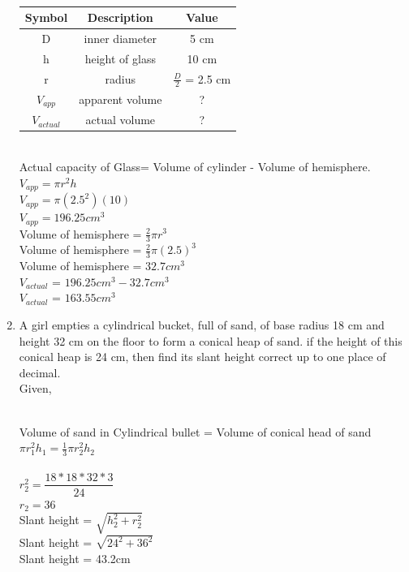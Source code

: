 \documentclass[journal,12pt,twocolumn]{IEEEtran}
\renewcommand\thesection{\arabic{section}}
\begin{document}
\begin{enumerate}[label=\thesection.\arabic*.,ref=\thesection.\theenumi]
\begin{table}[ht]
{\begin{tabular}{ |c|c|c| }
 \hline
 Symbol & Description & Value\\
 \hline
 D & inner diameter & 5 cm \\
 \hline
 h & height of glass & 10 cm \\
 \hline
 r & radius & $\frac{D}{2}$ = 2.5 cm \\
 \hline
 $V_{app}$ & apparent volume & ? \\
 \hline
 $V_{actual}$ & actual volume & ? \\
 \hline
\end{tabular}}
 \caption{}
 \end{table} \\
Actual capacity of Glass= Volume of cylinder - Volume of hemisphere.\\
$V_{app} = \pi r^2 h$\\
$V_{app} = \pi (2.5^2) (10)$\\
$V_{app} = 196.25cm^3$\\
Volume of hemisphere = $\frac{2}{3} \pi r^3$\\
Volume of hemisphere = $\frac{2}{3} \pi (2.5)^3$\\
Volume of hemisphere = $32.7cm^3$\\
$V_{actual}$ = $196.25cm^3 -32.7cm^3 $\\
$V_{actual}$ = $163.55cm^3$\\
\item A girl empties a cylindrical bucket, full of sand, of base radius 18 cm and height 32 cm on the floor to form a conical heap of sand. if the height of this conical heap  is 24 cm, then find its slant height correct up to one place of decimal. \\
\solution Given, \\
\begin{table}[ht]
 \centering
 \caption{}
 \end{table} \\
Volume of sand in Cylindrical bullet = Volume of conical head of sand\\
$\pi r_1^2 h_1 = \frac{1}{3} \pi r_2^2 h_2$\\ \\
$r_2^2 = \dfrac{18*18*32*3}{24}$\\
$r_2 = 36$\\
Slant height =  $\sqrt {h_2^2 +r_2^2}$ \\
Slant height =  $\sqrt {24^2 +36^2}$\\
Slant height =  43.2cm




\end{enumerate}
\end{document}
